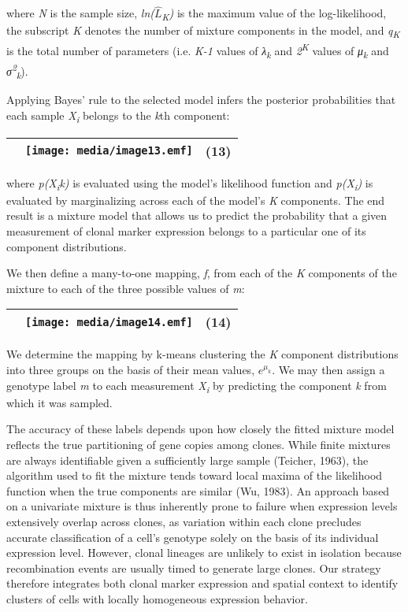 where \emph{N} is the sample size, \emph{ln(}\(\widehat{L}\)\emph{\textsubscript{K})} is the maximum value of the log-likelihood, the subscript \emph{K} denotes the number of mixture components in the model, and \emph{q\textsubscript{K}} is the total number of parameters (i.e. \emph{K-1} values of \emph{λ\textsubscript{k}} and \emph{2\textsuperscript{K}} values of \emph{μ\textsubscript{k}} and \emph{σ\textsuperscript{2}\textsubscript{k}}).

Applying Bayes' rule to the selected model infers the posterior probabilities that each sample \emph{X\textsubscript{i}} belongs to the \emph{k}th component:

\begin{longtable}[]{@{}lll@{}}
\toprule
& \texttt{[image: media/image13.emf]} & (13)\tabularnewline
\bottomrule
\end{longtable}

where \emph{p(X\textsubscript{i}\textbar{}k)} is evaluated using the model's likelihood function and \emph{p(X\textsubscript{i})} is evaluated by marginalizing across each of the model's \emph{K} components. The end result is a mixture model that allows us to predict the probability that a given measurement of clonal marker expression belongs to a particular one of its component distributions.

We then define a many-to-one mapping, \emph{f}, from each of the \emph{K} components of the mixture to each of the three possible values of \emph{m}:

\begin{longtable}[]{@{}lll@{}}
\toprule
& \texttt{[image: media/image14.emf]} & (14)\tabularnewline
\bottomrule
\end{longtable}

We determine the mapping by k-means clustering the \emph{K} component distributions into three groups on the basis of their mean values, \(e^{\mu_{k}}\). We may then assign a genotype label \emph{m} to each measurement \emph{X\textsubscript{i}} by predicting the component \emph{k} from which it was sampled.

The accuracy of these labels depends upon how closely the fitted mixture model reflects the true partitioning of gene copies among clones. While finite mixtures are always identifiable given a sufficiently large sample (Teicher, 1963), the algorithm used to fit the mixture tends toward local maxima of the likelihood function when the true components are similar (Wu, 1983). An approach based on a univariate mixture is thus inherently prone to failure when expression levels extensively overlap across clones, as variation within each clone precludes accurate classification of a cell's genotype solely on the basis of its individual expression level. However, clonal lineages are unlikely to exist in isolation because recombination events are usually timed to generate large clones. Our strategy therefore integrates both clonal marker expression and spatial context to identify clusters of cells with locally homogeneous expression behavior.

